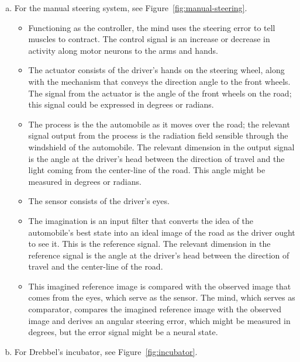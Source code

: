 \begin{enumerate}[(a)]
   \item For the manual steering system, see Figure~\ref{fig:manual-steering}.
      \begin{itemize}
         \item Functioning as the controller, the mind uses the steering error
            to tell muscles to contract. The control signal is an increase or
            decrease in activity along motor neurons to the arms and hands.
         \item The actuator consists of the driver's hands on the steering
            wheel, along with the mechanism that conveys the direction angle to
            the front wheels. The signal from the actuator is the angle of the
            front wheels on the road; this signal could be expressed in degrees
            or radians.
         \item The process is the the automobile as it moves over the road; the
            relevant signal output from the process is the radiation field
            sensible through the windshield of the automobile. The relevant
            dimension in the output signal is the angle at the driver's head
            between the direction of travel and the light coming from the
            center-line of the road. This angle might be measured in degrees or
            radians.
         \item The sensor consists of the driver's eyes.
         \item The imagination is an input filter that converts the idea of the
            automobile's best state into an ideal image of the road as the
            driver ought to see it.  This is the reference signal. The relevant
            dimension in the reference signal is the angle at the driver's head
            between the direction of travel and the center-line of the road.
         \item This imagined reference image is compared with the observed
            image that comes from the eyes, which serve as the sensor.  The
            mind, which serves as comparator, compares the imagined reference
            image with the observed image and derives an angular steering
            error, which might be measured in degrees, but the error signal
            might be a neural state.
      \end{itemize}
   \item For Drebbel's incubator, see Figure~\ref{fig:incubator}.
      \begin{itemize}

\end{itemize}
\end{enumerate}
